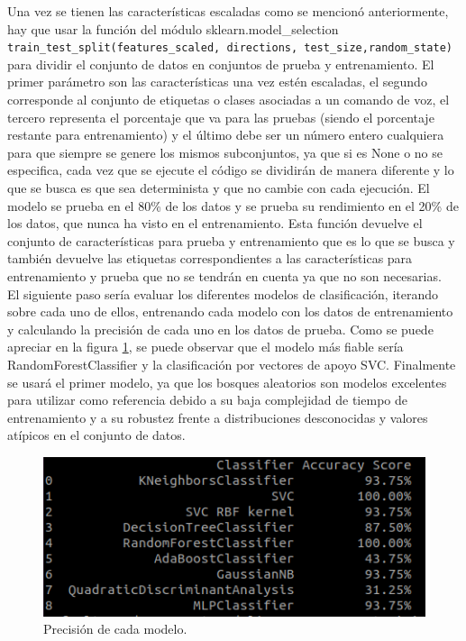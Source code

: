Una vez se tienen las características escaladas como se mencionó anteriormente, hay que usar la función del módulo sklearn.model\_selection \verb|train_test_split(features_scaled, directions, test_size,random_state)| para dividir el conjunto de datos en conjuntos de prueba y entrenamiento. El primer parámetro son las características una vez estén escaladas, el segundo corresponde al conjunto de etiquetas o clases asociadas a un comando de voz, el tercero representa el porcentaje que va para las pruebas (siendo el porcentaje restante para entrenamiento) y el último debe ser un número entero cualquiera para que siempre se genere los mismos subconjuntos, ya que si es None o no se especifica, cada vez que se ejecute el código se dividirán de manera diferente y lo que se busca es que sea determinista y que no cambie con cada ejecución. El modelo se prueba en el 80\% de los datos y se prueba su rendimiento en el 20\% de los datos, que nunca ha visto en el entrenamiento. Esta función devuelve el conjunto de características para prueba y entrenamiento que es lo que se busca y también devuelve las etiquetas correspondientes a las características para entrenamiento y prueba que no se tendrán en cuenta ya que no son necesarias.\\

El siguiente paso sería evaluar los diferentes modelos de clasificación, iterando sobre cada uno de ellos, entrenando cada modelo con los datos de entrenamiento y calculando la precisión de cada uno en los datos de prueba. Como se puede apreciar en la figura \ref{fig:modelos}, se puede observar que el modelo más fiable sería RandomForestClassifier y la clasificación por vectores de apoyo SVC. Finalmente se usará el primer modelo, ya que los bosques aleatorios son modelos excelentes para utilizar como referencia debido a su baja complejidad de tiempo de entrenamiento y a su robustez frente a distribuciones desconocidas y valores atípicos en el conjunto de datos.

\begin{figure}[H]
  \centering
  \includegraphics[scale=0.6]{figs/modelos} %
  \caption{ Precisión de cada modelo.}
  \label{fig:modelos}
\end{figure} 

